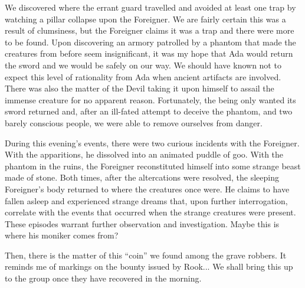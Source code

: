 We discovered where the errant guard travelled and avoided at least one trap by watching a pillar collapse upon the Foreigner.  We are fairly certain this was a result of clumsiness, but the Foreigner claims it was a trap and there were more to be found.  Upon discovering an armory patrolled by a phantom that made the creatures from before seem insignificant, it was my hope that Ada would return the sword and we would be safely on our way.  We should have known not to expect this level of rationality from Ada when ancient artifacts are involved.  There was also the matter of the Devil taking it upon himself to assail the immense creature for no apparent reason.  Fortunately, the being only wanted its sword returned and, after an ill-fated attempt to deceive the phantom, and two barely conscious people, we were able to remove ourselves from danger.

During this evening’s events, there were two curious incidents with the Foreigner.  With the apparitions, he dissolved into an animated puddle of goo.  With the phantom in the ruins, the Foreigner reconstituted himself into some strange beast made of stone.  Both times, after the altercations were resolved, the sleeping Foreigner’s body returned to where the creatures once were.  He claims to have fallen asleep and experienced strange dreams that, upon further interrogation, correlate with the events that occurred when the strange creatures were present.  These episodes warrant further observation and investigation.  Maybe this is where his moniker comes from?

Then, there is the matter of this “coin” we found among the grave robbers.  It reminds me of markings on the bounty issued by Rook... We shall bring this up to the group once they have recovered in the morning.

